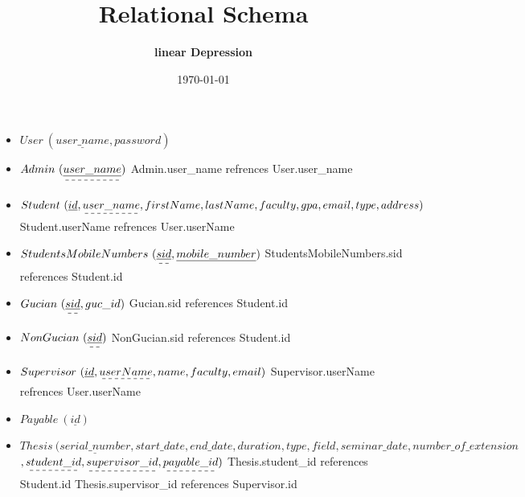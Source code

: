 \documentclass[a4paper]{article}
\begin{document}
\author{\textbf{linear Depression}}
\title{\textbf{Relational Schema}}
\date {\today}
\maketitle

\noindent
\begin{itemize}
 \item $User\ (\underline{user\_name},password) $
 \newline
 \item $Admin\ (\dashuline{\underline{user\_name}}) $ 
 \newline Admin.user\_name refrences User.user\_name
 \newline  
 \item$Student \  (\underline{id},\dashuline{user\_name} ,firstName, lastName , faculty, gpa, email,type,address )$
 \newline Student.userName refrences User.userName
 \newline
 \item$StudentsMobileNumbers\  (\dashuline{\underline{sid}}, \underline{mobile\_number})$
    \newline StudentsMobileNumbers.sid references Student.id 
 \newline
 \item$ Gucian \ (\dashuline{\underline{sid}}, guc\_id)$
    \newline Gucian.sid references Student.id   
\newline
\item$ NonGucian \ (\dashuline{\underline{sid}})$
    \newline NonGucian.sid references Student.id
\newline
\item$Supervisor \ (\underline{id},\dashuline{userName}, name , faculty, email)$
\newline Supervisor.userName refrences User.userName
\item$Payable\ (\underline{id})$
\newline
\item$ Thesis \ (\underline{serial\_number}, start\_date, end\_date, duration , type,field, seminar\_date, number\_of\_extension$\newline$ ,\dashuline{student\_id} ,\dashuline{supervisor\_id} , \dashuline{payable\_id})$
    \newline Thesis.student\_id references Student.id
    \newline Thesis.supervisor\_id references Supervisor.id

\end{itemize}
\end{document}
